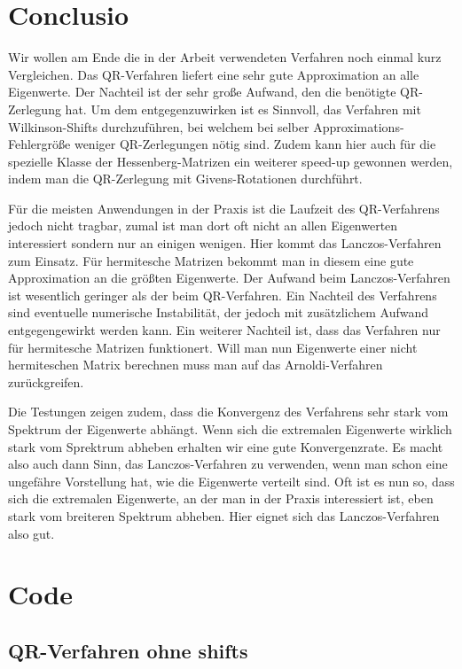 \documentclass{article}
\theoremstyle{plain}
\begin{document}
\newpage
\section{Conclusio}

Wir wollen am Ende die in der Arbeit verwendeten Verfahren noch einmal kurz Vergleichen. Das QR-Verfahren liefert eine sehr gute Approximation an alle Eigenwerte. Der Nachteil ist der sehr große Aufwand, den die benötigte QR-Zerlegung hat. Um dem entgegenzuwirken ist es Sinnvoll, das Verfahren mit Wilkinson-Shifts durchzuführen, bei welchem bei selber Approximations-Fehlergröße weniger QR-Zerlegungen nötig sind. Zudem kann hier auch für die spezielle Klasse der Hessenberg-Matrizen ein weiterer speed-up gewonnen werden, indem man die QR-Zerlegung mit Givens-Rotationen durchführt.

Für die meisten Anwendungen in der Praxis ist die Laufzeit des QR-Verfahrens jedoch nicht tragbar, zumal ist man dort oft nicht an allen Eigenwerten interessiert sondern nur an einigen wenigen. Hier kommt das Lanczos-Verfahren zum Einsatz. Für hermitesche Matrizen bekommt man in diesem eine gute Approximation an die größten Eigenwerte. Der Aufwand beim Lanczos-Verfahren ist wesentlich geringer als der beim QR-Verfahren. Ein Nachteil des Verfahrens sind eventuelle numerische Instabilität, der jedoch mit zusätzlichem Aufwand entgegengewirkt werden kann. Ein weiterer Nachteil ist, dass das Verfahren nur für hermitesche Matrizen funktionert. Will man nun Eigenwerte einer nicht hermiteschen Matrix berechnen muss man auf das Arnoldi-Verfahren zurückgreifen.

Die Testungen zeigen zudem, dass die Konvergenz des Verfahrens sehr stark vom Spektrum der Eigenwerte abhängt. Wenn sich die extremalen Eigenwerte wirklich stark vom Sprektrum abheben erhalten wir eine gute Konvergenzrate. Es macht also auch dann Sinn, das Lanczos-Verfahren zu verwenden, wenn man schon eine ungefähre Vorstellung hat, wie die Eigenwerte verteilt sind. Oft ist es nun so, dass sich die extremalen Eigenwerte, an der man in der Praxis interessiert ist, eben stark vom breiteren Spektrum abheben. Hier eignet sich das Lanczos-Verfahren also gut.

\newpage
\pagestyle{plain}
\section*{Code}

\subsection*{QR-Verfahren ohne shifts}
\end{document}
